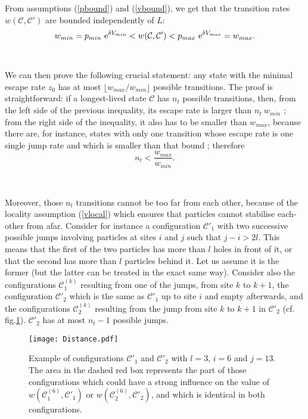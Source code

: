 \documentclass[aps,pre,onecolumn,showpacs,showkeys,a4paper]{revtex4-1}
\begin{document}
From assumptions (\ref{pbound}) and (\ref{vbound}), we get that the transition rates $w(\mathcal{C},\mathcal{C}')$ are bounded independently of $L$:
\begin{equation}
w_{min}=p_{min}~{\rm e}^{\delta V_{min}}<w(\mathcal{C},\mathcal{C}')<p_{max}~{\rm e}^{\delta V_{max}}=w_{max}.
\end{equation}

~~

We can then prove the following crucial statement: any state with the minimal escape rate $z_0$ has at most $\bigl\lfloor w_{max}/w_{min}\bigr\rfloor$ possible transitions. The proof is straightforward: if a longest-lived state $\mathcal{C}$ has $n_t$ possible transitions, then, from the left side of the previous inequality, its escape rate is larger than $n_t~w_{min}$ ; from the right side of the inequality, it also has to be smaller than $w_{max}$, because there are, for instance, states with only one transition whose escape rate is one single jump rate and which is smaller than that bound ; therefore
\begin{equation}
n_t< \frac{w_{max}}{w_{min}}.
\end{equation}

~~

Moreover, those $n_t$ transitions cannot be too far from each other, because of the locality assumption (\ref{vlocal}) which ensures that particles cannot stabilise each-other from afar. Consider for instance a configuration $\mathcal{C}'_1$ with two successive possible jumps involving particles at sites $i$ and $j$ such that $j-i>2l$. This means that the first of the two particles has more than $l$ holes in front of it, or that the second has more than $l$ particles behind it. Let us assume it is the former (but the latter can be treated in the exact same way). Consider also the configurations $\mathcal{C}_1^{(k)}$ resulting from one of the jumps, from site $k$ to $k+1$, the configuration $\mathcal{C}'_2$ which is the same as $\mathcal{C}'_1$ up to site $i$ and empty  afterwards, and the configurations $\mathcal{C}_2^{(k)}$ resulting from the jump from site $k$ to $k+1$ in $\mathcal{C}'_2$ (cf. fig.\ref{fig-Distance}). $\mathcal{C}'_2$ has at most $n_t-1$ possible jumps. 

 \begin{figure}[ht]
\begin{center}
 \texttt{[image: Distance.pdf]}
  \caption{Example of configurations $\mathcal{C}'_1$ and $\mathcal{C}'_2$ with $l=3$, $i=6$ and $j=13$. The area in the dashed red box represents the part of those configurations which could have a strong influence on the value of $w(\mathcal{C}_1^{(6)},\mathcal{C}'_1)$ or $w(\mathcal{C}_2^{(6)},\mathcal{C}'_2)$, and which is identical in both configurations.}
\label{fig-Distance}
 \end{center}
 \end{figure}
\end{document}
